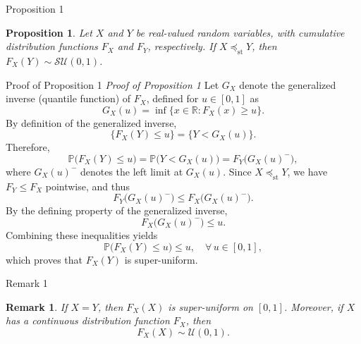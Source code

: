 \documentclass{beamer}
\newtheorem{proposition}{Proposition}
\newtheorem{remark}{Remark}
\begin{document}
\begin{frame}{Proposition 1}
  \begin{proposition}\label{prop_repartition}
    Let $X$ and $Y$ be real-valued random variables, with cumulative distribution functions $F_X$ and $F_Y$, respectively.
    If $X \preceq_{\mathrm{st}} Y$, then $F_X(Y) \sim \mathcal{SU}(0,1)$.
  \end{proposition}
\end{frame}

\begin{frame}[allowframebreaks]{Proof of Proposition 1}
  \textit{Proof of Proposition 1}
    Let \(G_X\) denote the generalized inverse (quantile function) of \(F_X\),
    defined for \(u\in[0,1]\) as
    \begin{equation*}
      G_X(u) = \inf\{x\in\mathbb{R} : F_X(x) \ge u\}.
    \end{equation*}
    By definition of the generalized inverse,
    \begin{equation*}
      \{F_X(Y) \le u\} = \{Y < G_X(u)\}.
    \end{equation*}
    Therefore,
    \begin{equation*}
      \mathbb{P}\bigl(F_X(Y)\le u\bigr)
      = \mathbb{P}\bigl(Y < G_X(u)\bigr)
      = F_Y\bigl(G_X(u)^-\bigr),
    \end{equation*}
    where \(G_X(u)^-\) denotes the left limit at \(G_X(u)\).
    Since \(X \preceq_{\mathrm{st}} Y\), we have \(F_Y \le F_X\) pointwise, and thus
    \begin{equation*}
      F_Y\bigl(G_X(u)^-\bigr) \le F_X\bigl(G_X(u)^-\bigr).
    \end{equation*}
    By the defining property of the generalized inverse,
    \begin{equation*}
      F_X\bigl(G_X(u)^-\bigr) \le u.
    \end{equation*}
    Combining these inequalities yields
    \begin{equation*}
      \mathbb{P}\bigl(F_X(Y)\le u\bigr) \leq u, \quad \forall\, u\in[0,1],
    \end{equation*}
    which proves that \(F_X(Y)\) is super-uniform.
\end{frame}

\begin{frame}{Remark 1}
  \begin{remark}\label{remark_FXX_unif}
    If \(X=Y\), then \(F_X(X)\) is super-uniform on \([0,1]\).
    Moreover, if \(X\) has a continuous distribution function \(F_X\), then
    \begin{equation*}
      F_X(X) \sim \mathcal{U}(0,1).
    \end{equation*}
  \end{remark}
\end{frame}
\end{document}

